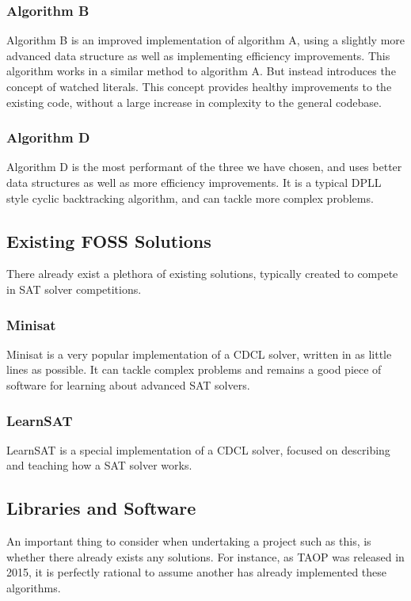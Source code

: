 \documentclass{article}
\begin{document}
\subsubsection{Algorithm B}
Algorithm B is an improved implementation of algorithm A, using a slightly more advanced data structure as well as implementing efficiency improvements.
This algorithm works in a similar method to algorithm A. But instead introduces the concept of watched literals. This concept provides
healthy improvements to the existing code, without a large increase in complexity to the general codebase. 

\subsubsection{Algorithm D}
Algorithm D is the most performant of the three we have chosen, and uses better data structures as well as more efficiency improvements. It is a typical
DPLL style cyclic backtracking algorithm, and can tackle more complex problems.

\subsection{Existing FOSS Solutions}
There already exist a plethora of existing solutions, typically created to compete in SAT solver competitions.
\subsubsection{Minisat}
Minisat is a very popular implementation of a CDCL solver, written in as little lines as possible. It can tackle complex problems and remains a good piece
of software for learning about advanced SAT solvers.
\subsubsection{LearnSAT}
LearnSAT is a special implementation of a CDCL solver, focused on describing and teaching how a SAT solver works.

\subsection{Libraries and Software}
An important thing to consider when undertaking a project such as this, is whether there already exists any solutions. For instance, as TAOP
was released in 2015, it is perfectly rational to assume another has already implemented these algorithms.
\end{document}
